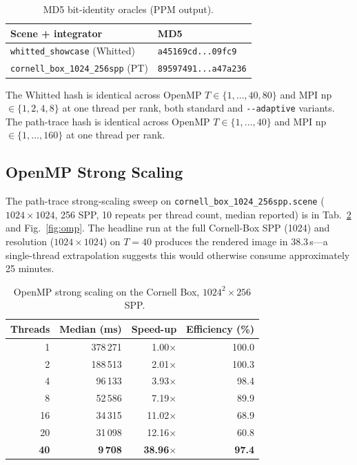 \documentclass[twocolumn,10pt,cleanhead,cleanfoot]{asme2e}
\begin{document}
\begin{table}[h]
\caption{MD5 bit-identity oracles (PPM output).}
\label{tab:md5}
\begin{center}\scriptsize
\begin{tabular}{ll}
\toprule
Scene + integrator & MD5 \\
\midrule
\texttt{whitted\_showcase} (Whitted) & \texttt{a45169cd...09fc9} \\
\texttt{cornell\_box\_1024\_256spp} (PT) & \texttt{89597491...a47a236} \\
\bottomrule
\end{tabular}
\end{center}
\end{table}

The Whitted hash is identical across OpenMP $T\in\{1,\ldots,40,80\}$ and MPI np$\in\{1,2,4,8\}$ at one thread per rank, both standard and \texttt{-{}-adaptive} variants. The path-trace hash is identical across OpenMP $T\in\{1,\ldots,40\}$ and MPI np$\in\{1,\ldots,160\}$ at one thread per rank.

\subsection*{OpenMP Strong Scaling}
The path-trace strong-scaling sweep on \texttt{cornell\_box\_1024\_256spp.scene} ($1024\!\times\!1024$, 256 SPP, 10 repeats per thread count, median reported) is in Tab.~\ref{tab:omp-strong} and Fig.~\ref{fig:omp}. The headline run at the full Cornell-Box SPP (1024) and resolution ($1024\!\times\!1024$) on $T=40$ produces the rendered image in 38.3\,s---a single-thread extrapolation suggests this would otherwise consume approximately 25 minutes.

\begin{table}[h]
\caption{OpenMP strong scaling on the Cornell Box, $1024^2 \times 256$~SPP.}
\label{tab:omp-strong}
\begin{center}\small
\begin{tabular}{rrrr}
\toprule
Threads & Median (ms) & Speed-up & Efficiency (\%) \\
\midrule
1 & 378\,271 & 1.00$\times$ & 100.0 \\
2 & 188\,513 & 2.01$\times$ & 100.3 \\
4 & 96\,133 & 3.93$\times$ & 98.4 \\
8 & 52\,586 & 7.19$\times$ & 89.9 \\
16 & 34\,315 & 11.02$\times$ & 68.9 \\
20 & 31\,098 & 12.16$\times$ & 60.8 \\
\textbf{40} & \textbf{9\,708} & \textbf{38.96$\times$} & \textbf{97.4} \\
\bottomrule
\end{tabular}
\end{center}
\end{table}
\end{document}
